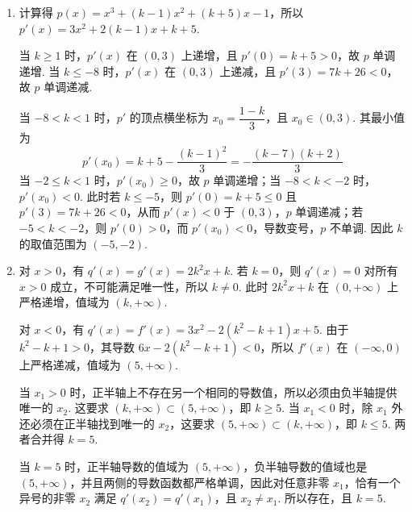 \begin{solution}
\begin{enumerate}
\item 计算得 \(p(x)=x^3+(k-1)x^2+(k+5)x-1\)，所以 \(p'(x)=3x^2+2(k-1)x+k+5\).

当 \(k\geqslant1\) 时，\(p'(x)\) 在 \((0,3)\) 上递增，且 \(p'(0)=k+5>0\)，故 \(p\) 单调递增. 当 \(k\leqslant-8\) 时，\(p'(x)\) 在 \((0,3)\) 上递减，且 \(p'(3)=7k+26<0\)，故 \(p\) 单调递减.

当 \(-8<k<1\) 时，\(p'\) 的顶点横坐标为 \(x_0=\dfrac{1-k}{3}\)，且 \(x_0\in(0,3)\). 其最小值为
\[
p'(x_0)=k+5-\frac{(k-1)^2}{3}=-\frac{(k-7)(k+2)}{3}
\]
当 \(-2\leqslant k<1\) 时，\(p'(x_0)\geqslant0\)，故 \(p\) 单调递增；当 \(-8<k<-2\) 时，\(p'(x_0)<0\). 此时若 \(k\leqslant-5\)，则 \(p'(0)=k+5\leqslant0\) 且 \(p'(3)=7k+26<0\)，从而 \(p'(x)<0\) 于 \((0,3)\)，\(p\) 单调递减；若 \(-5<k<-2\)，则 \(p'(0)>0\)，而 \(p'(x_0)<0\)，导数变号，\(p\) 不单调. 因此 \(k\) 的取值范围为 \((-5,-2)\).

\item 对 \(x>0\)，有 \(q'(x)=g'(x)=2k^2x+k\). 若 \(k=0\)，则 \(q'(x)=0\) 对所有 \(x>0\) 成立，不可能满足唯一性，所以 \(k\neq0\). 此时 \(2k^2x+k\) 在 \((0,+\infty)\) 上严格递增，值域为 \((k,+\infty)\).

对 \(x<0\)，有 \(q'(x)=f'(x)=3x^2-2(k^2-k+1)x+5\). 由于 \(k^2-k+1>0\)，其导数 \(6x-2(k^2-k+1)<0\)，所以 \(f'(x)\) 在 \((-\infty,0)\) 上严格递减，值域为 \((5,+\infty)\).

当 \(x_1>0\) 时，正半轴上不存在另一个相同的导数值，所以必须由负半轴提供唯一的 \(x_2\). 这要求 \((k,+\infty)\subset(5,+\infty)\)，即 \(k\geqslant5\). 当 \(x_1<0\) 时，除 \(x_1\) 外还必须在正半轴找到唯一的 \(x_2\)，这要求 \((5,+\infty)\subset(k,+\infty)\)，即 \(k\leqslant5\). 两者合并得 \(k=5\).

当 \(k=5\) 时，正半轴导数的值域为 \((5,+\infty)\)，负半轴导数的值域也是 \((5,+\infty)\)，并且两侧的导数函数都严格单调，因此对任意非零 \(x_1\)，恰有一个异号的非零 \(x_2\) 满足 \(q'(x_2)=q'(x_1)\)，且 \(x_2\neq x_1\). 所以存在，且 \(k=5\).
\end{enumerate}
\end{solution}
